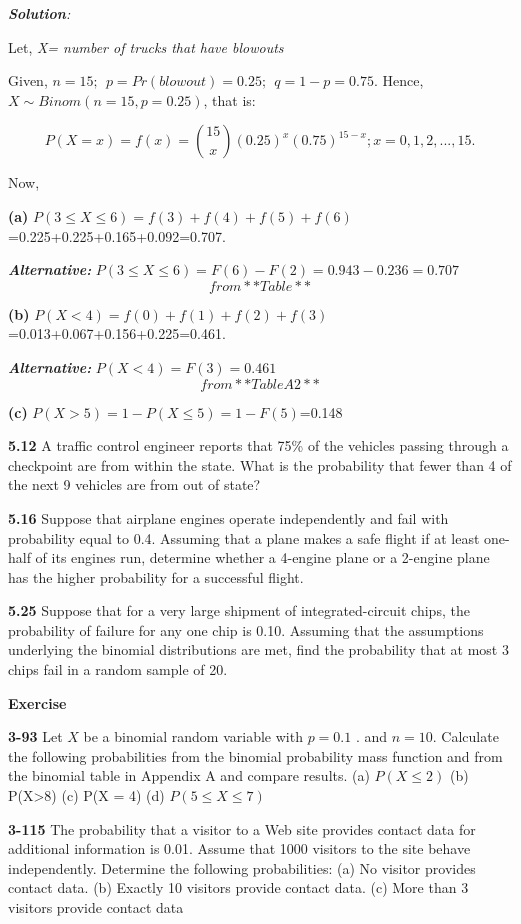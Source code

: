 \documentclass[
]{article}
\begin{document}
\emph{\textbf{Solution}:}

Let, \emph{X= number of trucks that have blowouts}

Given, \(n=15; \ \ p=Pr(blowout)=0.25; \ \ q=1-p=0.75\). Hence, \(X\sim Binom(n=15, p=0.25)\), that is:

\[
P(X=x)=f(x)=\binom{15}{x}(0.25)^x (0.75)^{15-x}; x=0,1,2,...,15.
\]

Now,

\textbf{(a)} \(P(3\le X\le 6)=f(3)+f(4)+f(5)+f(6)\)=0.225+0.225+0.165+0.092=0.707.

\textbf{\emph{Alternative:}} \(P(3\le X\le 6)=F(6)-F(2)=0.943-0.236=0.707\) \[from **Table**\]

\textbf{(b)} \(P(X<4)=f(0)+f(1)+f(2)+f(3)\)=0.013+0.067+0.156+0.225=0.461.

\textbf{\emph{Alternative:}} \(P(X< 4)=F(3)=0.461\) \[from **Table A2**\]

\textbf{(c)} \(P(X > 5)=1-P(X \le 5)=1-F(5)\)=0.148

\textbf{5.12} A traffic control engineer reports that 75\% of the vehicles passing through a checkpoint are from within the state. What is the probability that fewer than 4 of the next 9 vehicles are from out of state?

\textbf{5.16} Suppose that airplane engines operate independently and fail with probability equal to 0.4. Assuming that a plane makes a safe flight if at least one-half of its engines run, determine whether a 4-engine plane or a 2-engine plane has the higher probability for a successful flight.

\textbf{5.25} Suppose that for a very large shipment of integrated-circuit chips, the probability of failure for any one chip is 0.10. Assuming that the assumptions underlying the binomial distributions are met, find the probability that at most 3 chips fail in a random sample of 20.

\textbf{Exercise}\citep{montgomery_applied_2014}

\textbf{3-93} Let \(X\) be a binomial random variable with \(p = 0.1\) . and \(n = 10\). Calculate the following probabilities from the binomial probability mass function and from the binomial table in Appendix A and compare results. (a) \(P(X\le 2)\) (b) P(X\textgreater8) (c) P(X = 4) (d) \(P(5 \le X \le7)\)

\textbf{3-115} The probability that a visitor to a Web site provides contact data for additional information is 0.01. Assume that 1000 visitors to the site behave independently. Determine the following probabilities: (a) No visitor provides contact data. (b) Exactly 10 visitors provide contact data. (c) More than 3 visitors provide contact data
\end{document}
